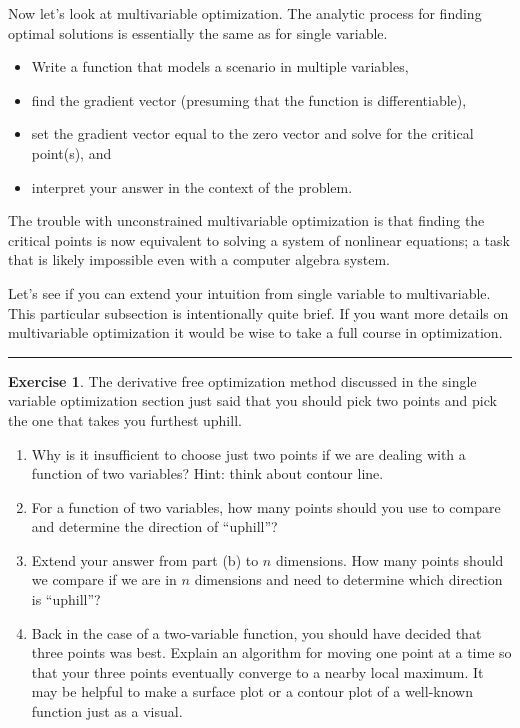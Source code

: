 \documentclass[
]{book}
\theoremstyle{definition}
\theoremstyle{definition}
\theoremstyle{definition}
\newtheorem{exercise}{Exercise}[chapter]
\theoremstyle{remark}
\begin{document}
Now let's look at multivariable optimization. The analytic process for
finding optimal solutions is essentially the same as for single
variable.

\begin{itemize}
\item
  Write a function that models a scenario in multiple variables,
\item
  find the gradient vector (presuming that the function is
  differentiable),
\item
  set the gradient vector equal to the zero vector and solve for the
  critical point(s), and
\item
  interpret your answer in the context of the problem.
\end{itemize}

The trouble with unconstrained multivariable optimization is that
finding the critical points is now equivalent to solving a system of
nonlinear equations; a task that is likely impossible even with a
computer algebra system.

Let's see if you can extend your intuition from single variable to
multivariable. This particular subsection is intentionally quite brief. If you want more details on multivariable optimization it would be wise to take a full course in optimization.

\begin{center}\rule{0.5\linewidth}{0.5pt}\end{center}

\begin{exercise}
\protect\hypertarget{exr:unnamed-chunk-203}{}{\label{exr:unnamed-chunk-203} }The derivative free optimization method discussed in the single variable
optimization section just said that you should pick two points and pick
the one that takes you furthest uphill.

\begin{enumerate}
\def\labelenumi{\alph{enumi}.}
\item
  Why is it insufficient to choose just two points if we are dealing
  with a function of two variables? Hint: think about contour line.
\item
  For a function of two variables, how many points should you use to
  compare and determine the direction of ``uphill''?
\item
  Extend your answer from part (b) to \(n\) dimensions. How many points
  should we compare if we are in \(n\) dimensions and need to determine
  which direction is ``uphill''?
\item
  Back in the case of a two-variable function, you should have decided
  that three points was best. Explain an algorithm for moving one
  point at a time so that your three points eventually converge to a
  nearby local maximum. It may be helpful to make a surface plot or a
  contour plot of a well-known function just as a visual.
\end{enumerate}
\end{exercise}
\end{document}
